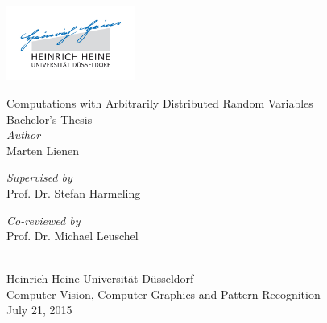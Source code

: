 \documentclass[11pt,a4paper]{book}
\begin{document}
\pagestyle{empty}

\frontmatter


\begin{titlepage}
  \begingroup
  \begin{center}
    \includegraphics[width=120pt]{thesis/logo}\\

    \vspace{9em}

    {\Huge Computations with Arbitrarily Distributed Random Variables}\\
    \vspace{2em}
    {\large Bachelor's Thesis}\\
    \vfill
    \small{\emph{Author}}\\
    \vspace{0.3em}
    {\LARGE Marten Lienen}\\
    \vspace{6em}
    \begin{minipage}{0.4\textwidth}
      \begin{flushleft}
        \small{\emph{Supervised by}}\\
        \vspace{0.3em}
        {\large Prof. Dr. Stefan Harmeling}
      \end{flushleft}
    \end{minipage}
    \hfill
    \begin{minipage}{0.4\textwidth}
      \begin{flushright}
        \small{\emph{Co-reviewed by}}\\
        \vspace{0.3em}
        {\large Prof. Dr. Michael Leuschel}
      \end{flushright}
    \end{minipage}
    \\
    \vspace{4em}
    {\Large Heinrich-Heine-Universität Düsseldorf}\\
    \vspace{0.5em}
    {\large Computer Vision, Computer Graphics and Pattern Recognition}\\
    \vspace{1em}
    July 21, 2015
  \end{center}
  \endgroup
\end{titlepage}
\end{document}
